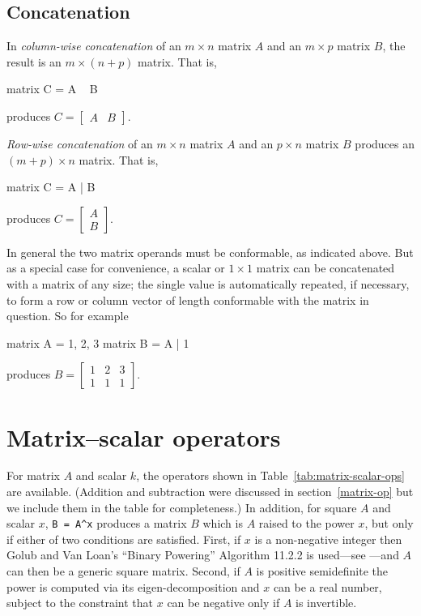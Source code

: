 \subsection{Concatenation}

In \textit{column-wise concatenation} of an $m\times n$ matrix $A$ and
an $m\times p$ matrix $B$, the result is an $m\times (n+p)$ matrix.
That is,
%
\begin{code}
matrix C = A ~ B
\end{code}
% 
produces $C = \left[ \begin{array}{cc} A & B \end{array} \right]$.

\textit{Row-wise concatenation} of an $m\times n$ matrix $A$ and
an $p\times n$ matrix $B$ produces an $(m+p) \times n$ matrix.
That is,

\begin{code}
matrix C = A | B
\end{code}
% 
produces $C = \left[ \begin{array}{cc} A \\ B \end{array} \right]$.

In general the two matrix operands must be conformable, as indicated
above. But as a special case for convenience, a scalar or $1 \times 1$
matrix can be concatenated with a matrix of any size; the single value
is automatically repeated, if necessary, to form a row or column
vector of length conformable with the matrix in question. So for
example
%
\begin{code}
matrix A = {1, 2, 3}
matrix B = A | 1
\end{code}
%
produces $B = \left[ \begin{array}{ccc} 1 & 2 & 3 \\
  1 & 1 & 1 \end{array} \right]$.

\section{Matrix--scalar operators}
\label{matrix-scalar-op}

For matrix $A$ and scalar $k$, the operators shown in
Table~\ref{tab:matrix-scalar-ops} are available.  (Addition and
subtraction were discussed in section~\ref{matrix-op} but we include
them in the table for completeness.)  In addition, for square $A$ and
scalar $x$, \verb|B = A^x| produces a matrix $B$ which is $A$ raised
to the power $x$, but only if either of two conditions are
satisfied. First, if $x$ is a non-negative integer then Golub and Van
Loan's ``Binary Powering'' Algorithm 11.2.2 is used---see
\cite{golub96}---and $A$ can then be a generic square matrix. Second,
if $A$ is positive semidefinite the power is computed via its
eigen-decomposition and $x$ can be a real number, subject to the
constraint that $x$ can be negative only if $A$ is invertible.

